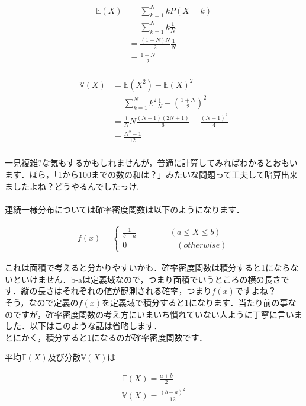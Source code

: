 \documentclass[11pt,a4paper]{jsarticle}                    %
\begin{document}
\begin{eqnarray}
\begin{split}
\mathbb{E}(X) &= \sum_{k=1}^N{kP(X=k)}\\
&=\sum_{k=1}^N{k\frac{1}{N}}\\
&= \frac{(1+N)N}{2}\frac{1}{N}\\
&= \frac{1+N}{2}
\end{split}
\end{eqnarray}

\begin{eqnarray}
\begin{split}
\mathbb{V}(X) &= \mathbb{E}(X^2) - \mathbb{E}(X)^2\\
&= \sum_{k=1}^N k^2 \frac{1}{N} - {(\frac{1+N}{2})}^2\\
&= \frac{1}{N}N\frac{(N+1)(2N+1)}{6}-\frac{(N+1)^2}{4}\\
&= \frac{N^2-1}{12}
\end{split}
\end{eqnarray}
\\
一見複雑?な気もするかもしれませんが，普通に計算してみればわかるとおもいます．ほら，「1から100までの数の和は？」みたいな問題って工夫して暗算出来ましたよね？どうやるんでしたっけ.\\
\\
連続一様分布については確率密度関数は以下のようになります．

\begin{eqnarray}
f(x) = 
\left\{
    \begin{array}{l}
      \frac{1}{b-a} \qquad \qquad  (a \leq X \leq b) \\
      0  \qquad \qquad \qquad(otherwise)
    \end{array}
  \right.
\end{eqnarray}

これは面積で考えると分かりやすいかも．確率密度関数は積分すると1にならないといけません．b-aは定義域なので，つまり面積でいうところの横の長さです．縦の長さはそれぞれの値が観測される確率，つまり$f(x)$ですよね？\\
そう，なので定義の$f(x)$を定義域で積分すると1になります．当たり前の事なのですが，確率密度関数の考え方にいまいち慣れていない人ように丁寧に言いました．以下はこのような話は省略します．\\
とにかく，積分すると1になるのが確率密度関数です．


平均$\mathbb{E}(X)$及び分散$\mathbb{V}(X)$は

\begin{eqnarray}
\mathbb{E}(X) = \frac{a+b}{2}\\
\mathbb{V}(X) = \frac{(b-a)^2}{12}
\end{eqnarray}
\end{document}

